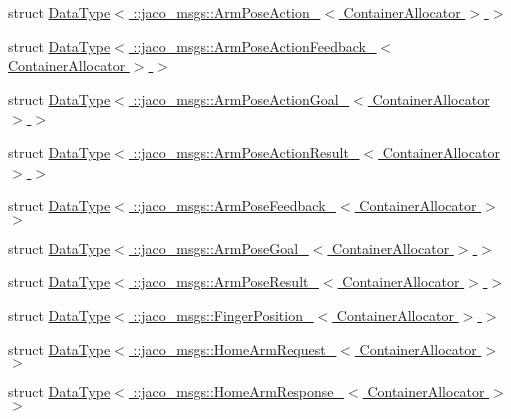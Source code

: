 \begin{DoxyCompactItemize}
\item 
struct \hyperlink{structros_1_1message__traits_1_1DataType_3_01_1_1jaco__msgs_1_1ArmPoseAction___3_01ContainerAllocator_01_4_01_4}{Data\+Type$<$ \+::jaco\+\_\+msgs\+::\+Arm\+Pose\+Action\+\_\+$<$ Container\+Allocator $>$ $>$}
\item 
struct \hyperlink{structros_1_1message__traits_1_1DataType_3_01_1_1jaco__msgs_1_1ArmPoseActionFeedback___3_01ContainerAllocator_01_4_01_4}{Data\+Type$<$ \+::jaco\+\_\+msgs\+::\+Arm\+Pose\+Action\+Feedback\+\_\+$<$ Container\+Allocator $>$ $>$}
\item 
struct \hyperlink{structros_1_1message__traits_1_1DataType_3_01_1_1jaco__msgs_1_1ArmPoseActionGoal___3_01ContainerAllocator_01_4_01_4}{Data\+Type$<$ \+::jaco\+\_\+msgs\+::\+Arm\+Pose\+Action\+Goal\+\_\+$<$ Container\+Allocator $>$ $>$}
\item 
struct \hyperlink{structros_1_1message__traits_1_1DataType_3_01_1_1jaco__msgs_1_1ArmPoseActionResult___3_01ContainerAllocator_01_4_01_4}{Data\+Type$<$ \+::jaco\+\_\+msgs\+::\+Arm\+Pose\+Action\+Result\+\_\+$<$ Container\+Allocator $>$ $>$}
\item 
struct \hyperlink{structros_1_1message__traits_1_1DataType_3_01_1_1jaco__msgs_1_1ArmPoseFeedback___3_01ContainerAllocator_01_4_01_4}{Data\+Type$<$ \+::jaco\+\_\+msgs\+::\+Arm\+Pose\+Feedback\+\_\+$<$ Container\+Allocator $>$ $>$}
\item 
struct \hyperlink{structros_1_1message__traits_1_1DataType_3_01_1_1jaco__msgs_1_1ArmPoseGoal___3_01ContainerAllocator_01_4_01_4}{Data\+Type$<$ \+::jaco\+\_\+msgs\+::\+Arm\+Pose\+Goal\+\_\+$<$ Container\+Allocator $>$ $>$}
\item 
struct \hyperlink{structros_1_1message__traits_1_1DataType_3_01_1_1jaco__msgs_1_1ArmPoseResult___3_01ContainerAllocator_01_4_01_4}{Data\+Type$<$ \+::jaco\+\_\+msgs\+::\+Arm\+Pose\+Result\+\_\+$<$ Container\+Allocator $>$ $>$}
\item 
struct \hyperlink{structros_1_1message__traits_1_1DataType_3_01_1_1jaco__msgs_1_1FingerPosition___3_01ContainerAllocator_01_4_01_4}{Data\+Type$<$ \+::jaco\+\_\+msgs\+::\+Finger\+Position\+\_\+$<$ Container\+Allocator $>$ $>$}
\item 
struct \hyperlink{structros_1_1message__traits_1_1DataType_3_01_1_1jaco__msgs_1_1HomeArmRequest___3_01ContainerAllocator_01_4_01_4}{Data\+Type$<$ \+::jaco\+\_\+msgs\+::\+Home\+Arm\+Request\+\_\+$<$ Container\+Allocator $>$ $>$}
\item 
struct \hyperlink{structros_1_1message__traits_1_1DataType_3_01_1_1jaco__msgs_1_1HomeArmResponse___3_01ContainerAllocator_01_4_01_4}{Data\+Type$<$ \+::jaco\+\_\+msgs\+::\+Home\+Arm\+Response\+\_\+$<$ Container\+Allocator $>$ $>$}

\end{DoxyCompactItemize}
